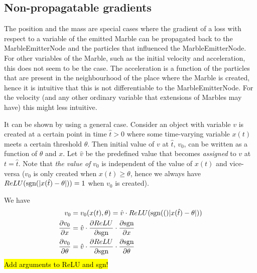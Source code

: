 \subsection{Non-propagatable gradients}

The position and the mass are special cases where the gradient of a loss with respect to a variable of the emitted Marble can be propagated back to the MarbleEmitterNode and the particles that influenced the MarbleEmitterNode. For other variables of the Marble, such as the initial velocity and acceleration, this does not seem to be the case. The acceleration is a function of the particles that are present in the neighbourhood of the place where the Marble is created, hence it is intuitive that this is not differentiable to the MarbleEmitterNode. For the velocity (and any other ordinary variable that extensions of Marbles may have) this might less intuitive.

It can be shown by using a general case. Consider an object with variable $v$ is created at a certain point in time $\hat{t} > 0$ where some time-varying variable $x(t)$ meets a certain threshold $\theta$. Then initial value of $v$ at $\hat{t}$, $v_0$, can be written as a function of $\theta$ and $x$. Let $\hat{v}$ be the predefined value that becomes \textit{assigned} to $v$ at $t = \hat{t}$. Note that \textit{the value of} $v_0$ is independent of the value of $x(t)$ and vice-versa ($v_0$ is only created when $x(t) \geq \theta$, hence we always have $ReLU(\text{sgn}(\lvert x(\hat{t}) - \theta \rvert)) = 1$ when $v_0$ is created).

We have 
\begin{align}
    v_0 &= v_0(x(t), \theta) = \hat{v} \cdot ReLU(\text{sgn}(()\lvert x(\hat{t}) - \theta \rvert)) \\
    \frac{\partial v_0}{\partial x} &= \hat{v} \cdot \frac{\partial ReLU}{\partial \text{sgn}} \cdot \frac{\partial \text{sgn}}{\partial x} \\
    \frac{\partial v_0}{\partial \theta} &= \hat{v} \cdot \frac{\partial ReLU}{\partial \text{sgn}} \cdot \frac{\partial \text{sgn}}{\partial \theta}
\end{align}
\hl{Add arguments to ReLU and sgn!}


